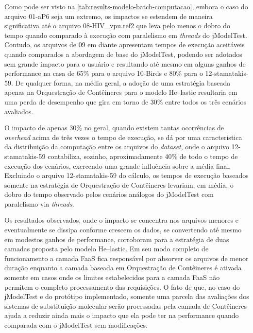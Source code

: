 \documentclass[english,brazilian]{UNISINOSmonografia} %
\begin{document}
Como pode ser visto na \autoref{tab:results-modelo-batch-computacao}, embora o caso do arquivo 01-aP6 seja um extremo, os impactos se estendem de maneira significativa até o arquivo 08-HIV\_vpu.ref2 que leva pelo menos o dobro do tempo quando comparado à execução com paralelismo em \textit{threads} do jModelTest.
%
Contudo, os arquivos de 09 em diante apresentam tempos de execução aceitáveis quando comparados a abordagem de base do jModelTest, podendo ser adotados sem grande impacto para o usuário e resultando até mesmo em alguns ganhos de performance na casa de 65\% para o arquivo 10-Birds e 80\% para o 12-stamatakis-59.
%
De qualquer forma, na média geral, a adoção de uma estratégia baseada apenas na Orquestração de Contêineres para o modelo \textsf{He}--lastic resultaria em uma perda de desempenho que gira em torno de 30\% entre todos os três cenários avaliados.


O impacto de apenas 30\% no geral, quando existem tantas ocorrências de \textit{overhead} acima de três vezes o tempo de execução, se dá por uma característica da distribuição da computação entre os arquivos do \textit{dataset}, onde o arquivo 12-stamatakis-59 contabiliza, sozinho, aproximadamente 40\% de todo o tempo de execução dos cenários, exercendo uma grande influência sobre a média final.
%
Excluindo o arquivo 12-stamatakis-59 do cálculo, os tempos de execução baseados somente na estratégia de Orquestração de Contêineres levariam, em média, o dobro do tempo observado pelos cenários análogos do jModelTest com paralelismo via \textit{threads}.


Os resultados observados, onde o impacto se concentra nos arquivos menores e eventualmente se dissipa conforme crescem os dados, se convertendo até mesmo em modestos ganhos de performance, corroboram para a estratégia de duas camadas proposta pelo modelo \textsf{He}--lastic.
%
Em seu modo completo de funcionamento a camada FaaS fica responsável por absorver os arquivos de menor duração enquanto a camada baseada em Orquestração de Contêineres é ativada somente em casos onde os limites estabelecidos para a camada FaaS não permitem o completo processamento das requisições.
%
O fato de que, no caso do jModelTest e do protótipo implementado, somente uma parcela das avaliações dos sistemas de substituição molecular serão processadas pela camada de Contêineres ajuda a reduzir ainda mais o impacto que ela pode ter na performance quando comparada com o jModelTest sem modificações.
\end{document}
